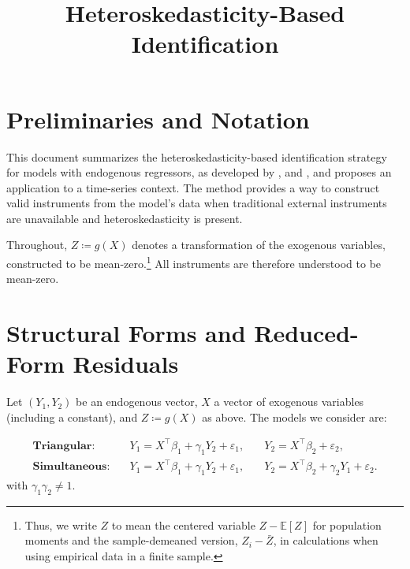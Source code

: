 \makeatletter
\newcommand{\E}{\mathbb{E}}
\newcommand{\cov}{\operatorname{Cov}}
\newcommand{\corr}{\operatorname{Corr}}
\newcommand{\var}{\operatorname{Var}}
\newcommand{\plim}{\operatorname*{plim}}
\newcommand{\argmin}{\operatorname*{arg\,min}}

\theoremstyle{plain}
\newtheorem{theorem}{Theorem}\newtheorem{remark}{Remark}
\newtheorem{cor}{Corollary}[section]

\newcommand{\T}{^{\intercal}}
\makeatother



\title{Heteroskedasticity-Based Identification}
\author{}
\date{}
\maketitle

\section{Preliminaries and Notation}

This document summarizes the heteroskedasticity-based identification
strategy for models with endogenous regressors, as developed by \textcite{lewbel2012},
\textcite{rigobon2003} and \textcite{prono2014}, and proposes an
application to a time-series context. The method provides a way to
construct valid instruments from the model's data when traditional
external instruments are unavailable and heteroskedasticity is present.

Throughout, $Z\coloneqq g(X)$ denotes a transformation of the exogenous
variables, constructed to be mean-zero.\footnote{Thus, we write $Z$ to mean the centered variable $Z-\E[Z]$ for population
moments and the sample-demeaned version, $Z_{i}-\bar{Z}$, in calculations
when using empirical data in a finite sample.} All instruments are therefore understood to be mean-zero.

\section{Structural Forms and Reduced-Form Residuals}

Let $(Y_{1},Y_{2})$ be an endogenous vector, $X$ a vector of exogenous
variables (including a constant), and $Z\coloneqq g(X)$ as above.
The models we consider are:

\begin{align*}
\textbf{Triangular:}\quad & Y_{1}=X\T\beta_{1}+\gamma_{1}Y_{2}+\varepsilon_{1}, & \quad Y_{2}=X\T\beta_{2}+\varepsilon_{2},\\[3pt]
\textbf{Simultaneous:}\quad & Y_{1}=X\T\beta_{1}+\gamma_{1}Y_{2}+\varepsilon_{1}, & \quad Y_{2}=X\T\beta_{2}+\gamma_{2}Y_{1}+\varepsilon_{2}.
\end{align*}
with $\gamma_{1}\gamma_{2}\neq1$.

